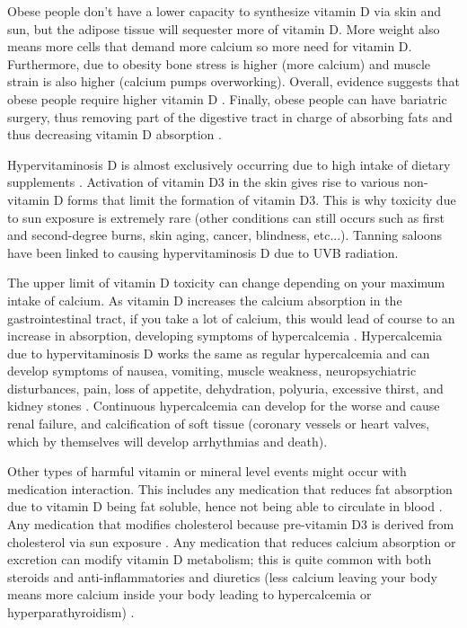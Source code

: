 Obese people don't have a lower capacity to synthesize vitamin D via skin and sun, but the adipose tissue will sequester more of vitamin D. More weight also means more cells that demand more calcium so more need for vitamin D. Furthermore, due to obesity bone stress is higher (more calcium) and muscle strain is also higher (calcium pumps overworking). Overall, evidence suggests that obese people require higher vitamin D \cite{ref:Ekwaru2014, ref:Drincic2013}. Finally, obese people can have bariatric surgery, thus removing part of the digestive tract in charge of absorbing fats and thus decreasing vitamin D absorption \cite{ref:Peterson2016, ref:Chakhtoura2017} .\vspace{3 mm}


Hypervitaminosis D is almost exclusively occurring due to high intake of dietary supplements \cite{ref:Galior2018, ref:Auguste2019, ref:Vogiatzi2014}. Activation of vitamin D3 in the skin gives rise to various non-vitamin D forms that limit the formation of vitamin D3. This is why toxicity due to sun exposure is extremely rare (other conditions can still occurs such as first and second-degree burns, skin aging, cancer, blindness, etc...). Tanning saloons have been linked to causing hypervitaminosis D due to UVB radiation. \cite{ref:Singh2014, ref:Laurent2017, ref:PrezCastrilln2007}
 
The upper limit of vitamin D toxicity can change depending on your maximum intake of calcium. As vitamin D increases the calcium absorption in the gastrointestinal tract, if you take a lot of calcium, this would lead of course to an increase in absorption, developing symptoms of hypercalcemia \cite{ref:Galior2018}. Hypercalcemia due to hypervitaminosis D works the same as regular hypercalcemia and can develop symptoms of nausea, vomiting, muscle weakness, neuropsychiatric disturbances, pain, loss of appetite, dehydration, polyuria, excessive thirst, and kidney stones \cite{1_Institute_of_Medicine2011-zg, ref:Jackson2006, ref:Malihi2019, ref:Malihi2016}. Continuous hypercalcemia can develop for the worse and cause renal failure, and calcification of soft tissue (coronary vessels or heart valves, which by themselves will develop arrhythmias and death).

Other types of harmful vitamin or mineral level events might occur with medication interaction. This includes any medication that reduces fat absorption due to vitamin D being fat soluble, hence not being able to circulate in blood \cite{ref:Gotfredsen2001, ref:James1997-lf, ref:McDuffie2002, ref:Robien2013}. Any medication that modifies cholesterol because pre-vitamin D3 is derived from cholesterol via sun exposure \cite{ref:Robien2013, ref:Schwartz2008, ref:PrezCastrilln2007, ref:Aloia2007}. Any medication that reduces calcium absorption or excretion can modify vitamin D metabolism; this is quite common with both steroids and anti-inflammatories and diuretics (less calcium leaving your body means more calcium inside your body leading to hypercalcemia or hyperparathyroidism) \cite{ref:Robien2013, ref:Crowe1984-or, ref:DRINKA1984, ref:Skversky2011, ref:Lukert1990, ref:deSvaux2002, ref:Buckley1996}. \vspace{3 mm}

